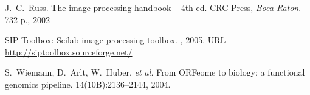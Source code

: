 \begin{thebibliography}{1}
    J.~C.~Russ.
   \newblock The image processing handbook -- 4th ed.
   \newblock CRC Press, {\em Boca Raton}. 732 p., 2002

    SIP Toolbox: Scilab image processing toolbox.
    , 2005.
    \newblock URL \url{http://siptoolbox.sourceforge.net/}

   S.~Wiemann, D.~Arlt, W.~Huber,  \textit{et al.}
   \newblock From ORFeome to biology: a functional genomics pipeline.
    14(10B):2136--2144, 2004.

\end{thebibliography}


\begin{figure}
\vspace*{.1in}
\end{figure}

\address{Oleg Sklyar and Wolfgang Huber\\
European Bioinformatics Institute\\ 
European Molecular Biology Laboratory\\
Wellcome Trust Genome Campus\\
Hinxton, Cambirdge\\
CB10 1SD\\
United Kingdom}


